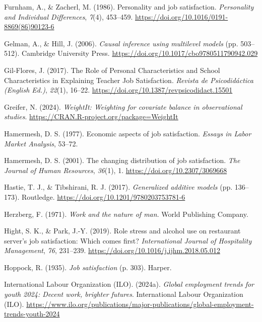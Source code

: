 \documentclass[
]{interact}
\newlength{\cslhangindent}
\newenvironment{CSLReferences}[2] %
 {\begin{list}{}{%
  \setlength{\itemindent}{0pt}
  \setlength{\leftmargin}{0pt}
  \setlength{\parsep}{0pt}
  \ifodd #1
   \setlength{\leftmargin}{\cslhangindent}
   \setlength{\itemindent}{-1\cslhangindent}
  \fi
  \setlength{\itemsep}{#2\baselineskip}}}
 {\end{list}}
\begin{document}
\begin{CSLReferences}{1}{0}
Furnham, A., \& Zacherl, M. (1986). Personality and job satisfaction.
\emph{Personality and Individual Differences}, \emph{7}(4), 453--459.
\url{https://doi.org/10.1016/0191-8869(86)90123-6}

Gelman, A., \& Hill, J. (2006). \emph{Causal inference using multilevel
models} (pp. 503--512). Cambridge University Press.
\url{https://doi.org/10.1017/cbo9780511790942.029}

Gil-Flores, J. (2017). The Role of Personal Characteristics and School
Characteristics in Explaining Teacher Job Satisfaction. \emph{Revista de
Psicodidáctica (English Ed.)}, \emph{22}(1), 16--22.
\url{https://doi.org/10.1387/revpsicodidact.15501}

Greifer, N. (2024). \emph{WeightIt: Weighting for covariate balance in
observational studies}.
\url{https://CRAN.R-project.org/package=WeightIt}

Hamermesh, D. S. (1977). Economic aspects of job satisfaction.
\emph{Essays in Labor Market Analysis}, 53--72.

Hamermesh, D. S. (2001). The changing distribution of job satisfaction.
\emph{The Journal of Human Resources}, \emph{36}(1), 1.
\url{https://doi.org/10.2307/3069668}

Hastie, T. J., \& Tibshirani, R. J. (2017). \emph{Generalized additive
models} (pp. 136--173). Routledge.
\url{https://doi.org/10.1201/9780203753781-6}

Herzberg, F. (1971). \emph{Work and the nature of man}. World Publishing
Company.

Hight, S. K., \& Park, J.-Y. (2019). Role stress and alcohol use on
restaurant server{'}s job satisfaction: Which comes first?
\emph{International Journal of Hospitality Management}, \emph{76},
231--239. \url{https://doi.org/10.1016/j.ijhm.2018.05.012}

Hoppock, R. (1935). \emph{Job satisfaction} (p. 303). Harper.

International Labour Organization (ILO). (2024a). \emph{Global
employment trends for youth 2024: Decent work, brighter futures}.
International Labour Organization (ILO).
\url{https://www.ilo.org/publications/major-publications/global-employment-trends-youth-2024}


\end{CSLReferences}
\end{document}
